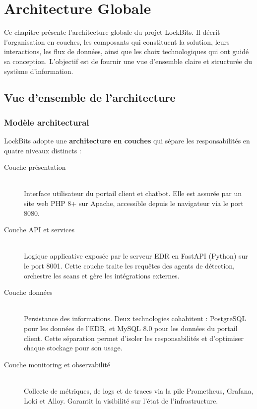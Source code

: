 
\chapter{Architecture Globale}

Ce chapitre présente l'architecture globale du projet LockBits. Il décrit
l'organisation en couches, les composants qui constituent la solution, leurs
interactions, les flux de données, ainsi que les choix technologiques qui ont
guidé sa conception. L'objectif est de fournir une vue d'ensemble claire et
structurée du système d'information.

\section{Vue d'ensemble de l'architecture}

\subsection{Modèle architectural}

LockBits adopte une \textbf{architecture en couches} qui sépare les
responsabilités en quatre niveaux distincts :

\begin{description}
  \item[Couche présentation] \\[2pt] Interface utilisateur du portail client et
    chatbot. Elle est assurée par un site web PHP 8+ sur Apache, accessible
    depuis le navigateur via le port 8080.
  \item[Couche API et services] \\[2pt] Logique applicative exposée par le serveur
    EDR en FastAPI (Python) sur le port 8001. Cette couche traite les
    requêtes des agents de détection, orchestre les scans et gère les
    intégrations externes.
  \item[Couche données] \\[2pt] Persistance des informations. Deux technologies
    cohabitent : PostgreSQL pour les données de l'EDR, et MySQL 8.0 pour les
    données du portail client. Cette séparation permet d'isoler les
    responsabilités et d'optimiser chaque stockage pour son usage.
  \item[Couche monitoring et observabilité] \\[2pt] Collecte de métriques, de logs
    et de traces via la pile Prometheus, Grafana, Loki et Alloy. Garantit
    la visibilité sur l'état de l'infrastructure.
\end{description}

